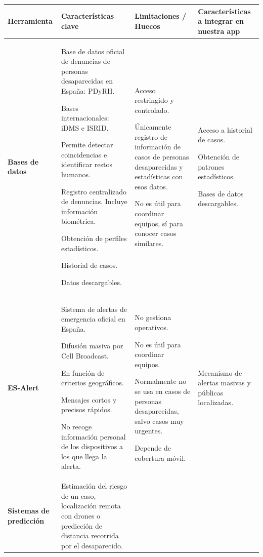 \begin{table}[htbp]
\centering
\footnotesize
\begin{tabular}{ |m{2cm}|m{5cm}|m{4cm}|m{3cm}|  } 
\hline
\cellcolor[HTML]{B9E3F0}\centering\textbf{Herramienta} & \cellcolor[HTML]{B9E3F0}\textbf{Características clave}& \cellcolor[HTML]{B9E3F0}\textbf{Limitaciones / Huecos}& \cellcolor[HTML]{B9E3F0}\textbf{Características a integrar en nuestra app}\\
\hline
\cellcolor[HTML]{EFEFEF}\textbf{Bases de datos} 
    & {Base de datos oficial de denuncias de personas desaparecidas en España: PDyRH.

    Bases internacionales: iDMS e ISRID.
    
    Permite detectar coincidencias e identificar restos humanos.
    
    Registro centralizado de denuncias.
    Incluye información biométrica.
    
    Obtención de perfiles estadísticos.
    
    Historial de casos.

    Datos descargables.
    } 
    & {Acceso restringido y controlado.

    Únicamente registro de información de casos de personas desaparecidas y estadísticas con esos datos.
    
    No es útil para coordinar equipos, sí para conocer casos similares.
    } 
    & {Acceso a historial de casos.

    Obtención de patrones estadísticos.
    
    Bases de datos descargables.
    }\\
\hline
\cellcolor[HTML]{EFEFEF}\textbf{ES-Alert} 
    & {Sistema de alertas de emergencia oficial en España.

    Difusión masiva por Cell Broadcast. 
    
    En función de criterios geográficos.
    
    Mensajes cortos y precisos rápidos.
    
    No recoge información personal de los dispositivos a los que llega la alerta.
    } 
    & {No gestiona operativos.

    No es útil para coordinar equipos.
    
    Normalmente no se usa en casos de personas desaparecidas, salvo casos muy urgentes.
    
    Depende de cobertura móvil.
    } 
    & {Mecanismo de alertas masivas y públicas localizadas.}\\
\hline
\cellcolor[HTML]{EFEFEF}\textbf{Sistemas de predicción} 
    & {Estimación del riesgo de un caso, localización remota con drones o predicción de distancia recorrida por el desaparecido. 

}
\end{tabular}
\end{table}
